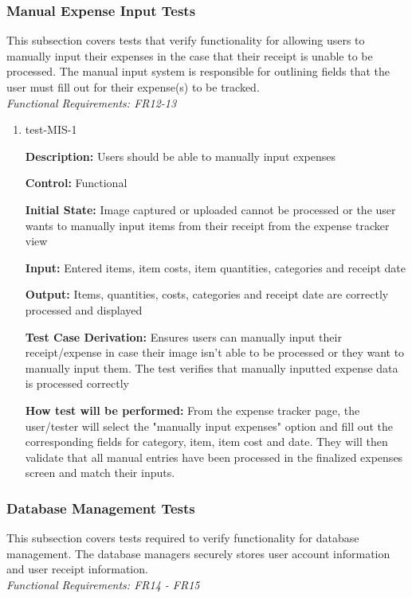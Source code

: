 \documentclass[12pt, titlepage]{article}
\begin{document}
\subsubsection{Manual Expense Input Tests}

This subsection covers tests that verify functionality for allowing users to manually input their expenses in the case that their receipt is unable to be processed. 
The manual input system is responsible for outlining fields that the user must fill out for their expense(s) to be tracked.\\
\textit{Functional Requirements: FR12-13}

\begin{enumerate}
\item{test-MIS-1\\}

\textbf{Description:} Users should be able to manually input expenses

\textbf{Control:} Functional

\textbf{Initial State:} Image captured or uploaded cannot be processed or the user wants to manually input items from their receipt from the expense tracker view

\textbf{Input:} Entered items, item costs, item quantities, categories and receipt date

\textbf{Output:} Items, quantities, costs, categories and receipt date are correctly processed and displayed 

\textbf{Test Case Derivation:} Ensures users can manually input their receipt/expense in case their image isn't able to be processed or they want to manually input them. The test verifies that manually inputted expense data is processed correctly

\textbf{How test will be performed:} From the expense tracker page, the user/tester will select the "manually input expenses" option and fill out the corresponding fields for category, item, item cost and date. They will then validate that all manual entries have been processed in the finalized expenses screen and match their inputs.	

\end{enumerate}

\subsubsection{Database Management Tests}

This subsection covers tests required to verify functionality for database management. The database managers securely stores user account information and user receipt information.\\
\textit{Functional Requirements: FR14 - FR15}
\end{document}
